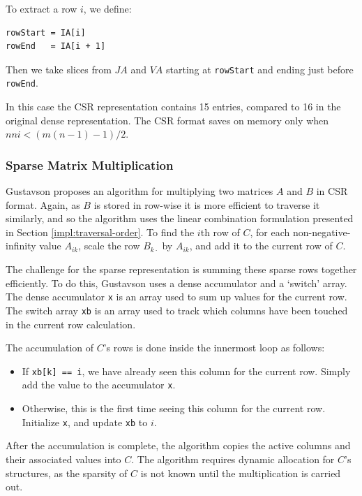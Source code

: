 \vspace{0.5em} %

To extract a row $i$, we define:

\begin{lstlisting}[frame=none,numbers=none]
rowStart = IA[i]
rowEnd   = IA[i + 1]
\end{lstlisting}

Then we take slices from $JA$ and $VA$ starting at \verb|rowStart| and ending just before \verb|rowEnd|.

In this case the CSR representation contains 15 entries, compared to 16 in the original dense representation. 
The CSR format saves on memory only when $nni < (m (n - 1) - 1)/2$.

\subsubsection{Sparse Matrix Multiplication}

Gustavson \cite{gustavson-sparse} proposes an algorithm for multiplying two matrices $A$ and $B$ in CSR format.
Again, as $B$ is stored in row-wise it is more efficient to traverse it similarly, and so the algorithm
uses the linear combination formulation presented in Section \ref{impl:traversal-order}.
To find the $i$th row of $C$, for each non-negative-infinity value $A_{ik}$, scale the row $B_{k\cdot}$ by $A_{ik}$,
and add it to the current row of $C$.

The challenge for the sparse representation is summing these sparse rows together efficiently. To do this, Gustavson 
uses a dense accumulator and a `switch' array. The dense accumulator \verb|x| is an array used to sum up values for the
current row. The switch array \verb|xb| is an array used to track which columns have been touched in the current row
calculation.

The accumulation of $C$'s rows is done inside the innermost loop as follows:

\begin{itemize}
  \item If \verb|xb[k] == i|, we have already seen this column for the current row. Simply add the value to the 
    accumulator \verb|x|.
  \item Otherwise, this is the first time seeing this column for the current row. Initialize \verb|x|, and update \verb|xb|
    to $i$.
\end{itemize}

After the accumulation is complete, the algorithm copies the active columns and their associated values into $C$.
The algorithm requires dynamic allocation for $C$'s structures, as the sparsity of $C$ is not known until the
multiplication is carried out.

